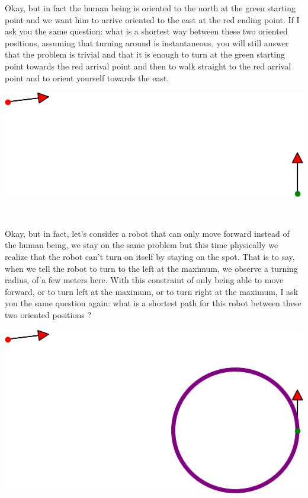 \documentclass[11pt,a4paper]{article}
\begin{document}
		\begin{minipage}{0.8\textwidth}
	\raggedright
	Okay, but in fact the human being is oriented to the north at the green starting point and we want him to arrive oriented to the east at the red ending point. If I ask you the same question: what is a shortest way between these two oriented positions, assuming that turning around is instantaneous, you will still answer that the problem is trivial and that it is enough to turn at the green starting point towards the red arrival point and then to walk straight to the red arrival point and to orient yourself towards the east.
	\end{minipage}
	\begin{minipage}{0.2\textwidth}
	\includegraphics[width=\linewidth]{Illustrations/humanOrientedSummary.png}
	\end{minipage}\\
	
	\begin{minipage}{0.8\textwidth}
	\raggedright
	Okay, but in fact, let's consider a robot that can only move forward instead of the human being, we stay on the same problem but this time physically we realize that the robot can't turn on itself by staying on the spot.
	That is to say, when we tell the robot to turn to the left at the maximum, we observe a turning radius, of a few meters here. With this constraint of only being able to move forward, or to turn left at the maximum, or to turn right at the maximum, I ask you the same question again: what is a shortest path for this robot between these two oriented positions ?
	\end{minipage}
	\begin{minipage}{0.2\textwidth}
	\includegraphics[width=\linewidth]{Illustrations/robotMinimumCircleSummary.png}
	\end{minipage}\\
	
\end{document}

